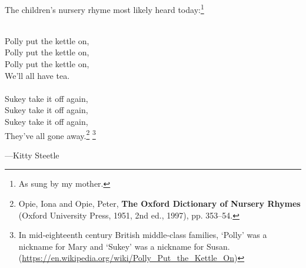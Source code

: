 \documentclass[11pt]{article}
\begin{document}
{\begin{minipage}{7.0in}
The children's nursery rhyme most likely heard
today:\footnote{As sung by my mother.}
    {\parindent0pt
      \raggedright
      ~\\
Polly put the kettle on, \\
Polly put the kettle on, \\
Polly put the kettle on, \\
We'll all have tea. \\
~\\
Sukey take it off again, \\
Sukey take it off again, \\
Sukey take it off again, \\
They've all gone away.\footnote{Opie, Iona and Opie, Peter, \textbf{The Oxford Dictionary of Nursery
  Rhymes} (Oxford University Press, 1951, 2nd ed., 1997),
  pp. 353–54.} \footnote{In mid-eighteenth century British
  middle-class families, `Polly' was a nickname for Mary and `Sukey'
  was a nickname for
  Susan. (\url{https://en.wikipedia.org/wiki/Polly\_Put\_the\_Kettle\_On})}
  ~\\
    }

    ---Kitty Steetle
    
  \end{minipage}
  \vspace*{\fill}
}
\end{document}
